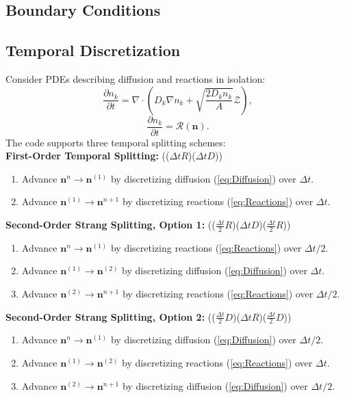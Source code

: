 \documentclass[final]{siamltex}
\newcommand{\nb}{\mathbf{n}}
\def\mRb {\bm{\mathcal{R}}}
\def\mZb {\bm{\mathcal{Z}}}
\begin{document}
\subsection{Boundary Conditions}

\subsection{Temporal Discretization}
Consider PDEs describing
diffusion and reactions in isolation:
\begin{equation}
\frac{\partial n_k}{\partial t} = \nabla\cdot\left(D_k\nabla n_k + \sqrt{\frac{2D_kn_k}{A}}\mZb\right),\label{eq:Diffusion}
\end{equation}
\begin{equation}
\frac{\partial n_k}{\partial t} = \mRb(\nb).\label{eq:Reactions}
\end{equation}
The code supports three temporal splitting schemes:\\

{\bf First-Order Temporal Splitting:}
(($\Delta t R$)($\Delta t D$))
\begin{enumerate}
\item Advance $\nb^n \rightarrow \nb^{(1)}$ by discretizing 
diffusion (\ref{eq:Diffusion}) over $\Delta t$.
\item Advance $\nb^{(1)} \rightarrow \nb^{n+1}$ by discretizing 
reactions (\ref{eq:Reactions}) over $\Delta t$.
\end{enumerate}

{\bf Second-Order Strang Splitting, Option 1:}
(($\frac{\Delta t}{2}R$)($\Delta t D$)($\frac{\Delta t}{2}R$))
\begin{enumerate}
\item Advance $\nb^n \rightarrow \nb^{(1)}$ by discretizing 
reactions (\ref{eq:Reactions}) over $\Delta t/2$.
\item Advance $\nb^{(1)} \rightarrow \nb^{(2)}$ by discretizing 
diffusion (\ref{eq:Diffusion}) over $\Delta t$.
\item Advance $\nb^{(2)} \rightarrow \nb^{n+1}$ by discretizing 
reactions (\ref{eq:Reactions}) over $\Delta t/2$.
\end{enumerate}

{\bf Second-Order Strang Splitting, Option 2:}
(($\frac{\Delta t}{2}D$)($\Delta t R$)($\frac{\Delta t}{2}D$))
\begin{enumerate}
\item Advance $\nb^n \rightarrow \nb^{(1)}$ by discretizing 
diffusion (\ref{eq:Diffusion}) over $\Delta t/2$.
\item Advance $\nb^{(1)} \rightarrow \nb^{(2)}$ by discretizing 
reactions (\ref{eq:Reactions}) over $\Delta t$.
\item Advance $\nb^{(2)} \rightarrow \nb^{n+1}$ by discretizing 
diffusion (\ref{eq:Diffusion}) over $\Delta t/2$.
\end{enumerate}
\end{document}

